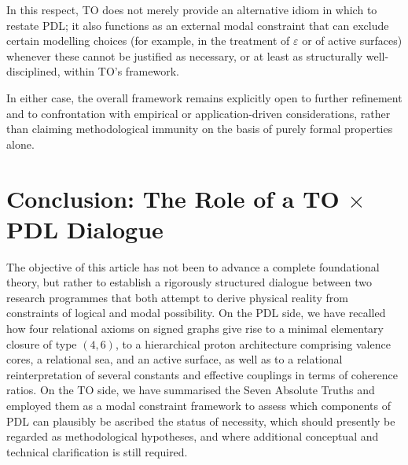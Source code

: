 \documentclass[11pt,a4paper]{article}
\begin{document}
In this respect, TO does not merely provide an alternative idiom in which to restate PDL; it also functions as an external modal constraint that can exclude certain modelling choices (for example, in the treatment of $\varepsilon$ or of active surfaces) whenever these cannot be justified as necessary, or at least as structurally well-disciplined, within TO’s framework.

In either case, the overall framework remains explicitly open to further refinement and to confrontation with empirical or application-driven considerations, rather than claiming methodological immunity on the basis of purely formal properties alone.

\section{Conclusion: The Role of a TO \texorpdfstring{$\times$}{×} PDL Dialogue}

The objective of this article has not been to advance a complete foundational theory, but rather to establish a rigorously structured dialogue between two research programmes that both attempt to derive physical reality from constraints of logical and modal possibility. On the PDL side, we have recalled how four relational axioms on signed graphs give rise to a minimal elementary closure of type $(4,6)$, to a hierarchical proton architecture comprising valence cores, a relational sea, and an active surface, as well as to a relational reinterpretation of several constants and effective couplings in terms of coherence ratios. On the TO side, we have summarised the Seven Absolute Truths and employed them as a modal constraint framework to assess which components of PDL can plausibly be ascribed the status of necessity, which should presently be regarded as methodological hypotheses, and where additional conceptual and technical clarification is still required.
\end{document}
